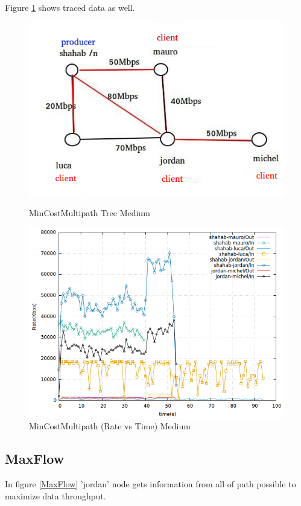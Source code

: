  
Figure \ref{mincost} shows traced data as well.
\begin{figure}[H]

\begin{center}

\includegraphics[scale = 0.4]{Figures/MinCostMultipath.png}

\caption{MinCostMultipath Tree Medium} \label{MinCostMultipath} 

\includegraphics[scale = 0.4]{Figures/mincostmultipath.png}
\caption{MinCostMultipath (Rate vs Time) Medium} \label{mincost} 

\end{center}

\end{figure}

\subsection{MaxFlow}
In figure \ref{MaxFlow} 'jordan' node gets information from all of path possible to maximize data throughput.

